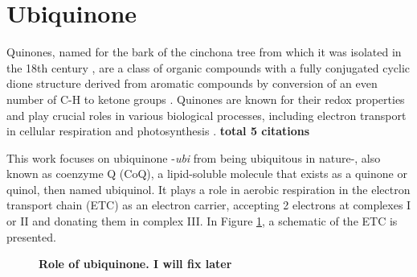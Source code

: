 \section{Ubiquinone}
Quinones, named for the bark of the cinchona tree from which it was isolated in the 18th century \cite{rusell1873quinone}, are a class of organic compounds with a fully conjugated cyclic dione structure derived from aromatic compounds by conversion of an even number of C-H to ketone groups \cite{IUPACQ050152025}. Quinones are known for their redox properties and play crucial roles in various biological processes, including electron transport in cellular respiration and photosynthesis \cite{ernster1995biochemical,chen2024low}. \textbf{total 5 citations}

This work focuses on ubiquinone -\textit{ubi} from being ubiquitous in nature-, also known as coenzyme Q (CoQ), a lipid-soluble molecule that exists as a quinone or quinol, then named ubiquinol. It plays a role in aerobic respiration in the electron transport chain (ETC) as an electron carrier, accepting 2 electrons at complexes I or II and donating them in complex III. In Figure \ref{fig:ETC}, a schematic of the ETC is presented.

\begin{figure}[hb!]
  \centering
  \caption[Role of ubiquinone]{\textbf{Role of ubiquinone. I will fix later}}
  \label{fig:ETC}
\end{figure}

